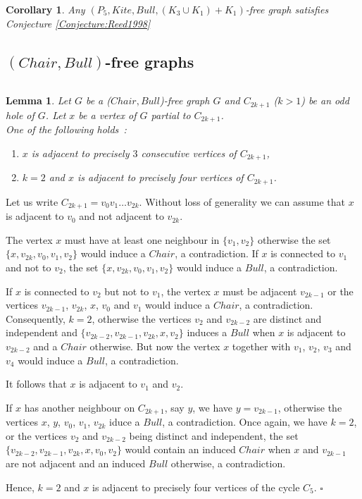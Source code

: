 \documentclass{amsart}
\newtheorem{cor}[thm]{Corollary}
\newtheorem{lem}[thm]{Lemma}
\theoremstyle{definition}
\theoremstyle{remark}
\newenvironment{prf}{{\bf \noindent Proof. } }{\hfill$\square$\\}
\begin{document}
\begin{cor}  \cite{AraKarSub2011} Any $(P_{5},Kite, Bull, (K_{3} \cup K_{1})+K_{1})$-free graph satisfies Conjecture \ref{Conjecture:Reed1998}
\end{cor}

\subsection{$(Chair, Bull)$-free graphs}
$\;$\\



\begin{lem}\label{lemma:Chair-bull-free}
Let $G$ be a ($Chair, Bull$)-free graph $G$ and $C_{2k+1}$ ($k>1$) be an odd hole of $G$. Let $x$ be a vertex of $G$ partial to $C_{2k+1}$.\\
One of the following holds~:
\begin{enumerate}
\item $x$ is adjacent to precisely $3$ consecutive vertices of $C_{2k+1}$,
\item  $k=2$ and $x$ is  adjacent to precisely four vertices of $C_{2k+1}$.
\end{enumerate}
\end{lem}
\begin{prf}
Let us write $C_{2k+1}=v_0v_1\ldots v_{2k}$. Without loss of generality we can assume that $x$ is adjacent to $v_0$ and not adjacent to $v_{2k}$.

The vertex $x$ must have at least one neighbour in $\{v_1,v_2\}$ otherwise the set $\{x,v_{2k},v_0,v_1,v_2\}$ would induce a $Chair$, a contradiction.
If $x$ is connected to $v_1$ and not to $v_2$, the set $\{x,v_{2k},v_0,v_1,v_2\}$ would induce a $Bull$, a contradiction.

If $x$ is connected to $v_2$ but not to $v_1$, the vertex $x$ must be adjacent $v_{2k-1}$ or the vertices $v_{2k-1}$, $v_{2k}$, $x$, $v_0$ and $v_1$ would induce a $Chair$, a contradiction. 
Consequently, $k=2$, otherwise the vertices $v_2$ and $v_{2k-2}$ are distinct and independent and $\{v_{2k-2}, v_{2k-1}, v_{2k}, x, v_2\}$ induces a $Bull$ when $x$ is adjacent to $v_{2k-2}$ and a $Chair$ otherwise. 
But now the vertex $x$ together with $v_1$, $v_2$, $v_3$ and $v_4$ would induce a $Bull$, a contradiction.

It follows that $x$ is adjacent to $v_1$ and $v_2$.

If $x$ has another neighbour on $C_{2k+1}$, say $y$, we have $y=v_{2k-1}$, otherwise the vertices $x$, $y$, $v_0$, $v_1$, $v_{2k}$ iduce a $Bull$, a contradiction. Once again, we have $k=2$, or the vertices  
$v_2$ and $v_{2k-2}$ being distinct and independent, the set $\{v_{2k-2}, v_{2k-1}, v_{2k},x, v_0, v_2\}$ would contain an induced $Chair$ when $x$ and $v_{2k-1}$ are not adjacent and an induced $Bull$ otherwise, a contradiction.

Hence, $k=2$ and $x$ is adjacent to precisely four vertices of the cycle $C_5$.
\end{prf}
\end{document}
